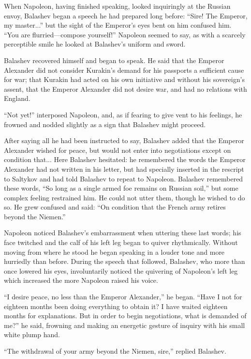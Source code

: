 When Napoleon, having finished speaking, looked inquiringly at
the Russian envoy, Balashev began a speech he had prepared long
before: ``Sire! The Emperor, my master...'' but the sight of the
Emperor's eyes bent on him confused him. ``You are
flurried---compose yourself!'' Napoleon seemed to say, as with a
scarcely perceptible smile he looked at Balashev's uniform and
sword.

Balashev recovered himself and began to speak. He said that the
Emperor Alexander did not consider Kurakin's demand for his
passports a sufficient cause for war; that Kurakin had acted on
his own initiative and without his sovereign's assent, that the
Emperor Alexander did not desire war, and had no relations with
England.

``Not yet!'' interposed Napoleon, and, as if fearing to give vent
to his feelings, he frowned and nodded slightly as a sign that
Balashev might proceed.

After saying all he had been instructed to say, Balashev added
that the Emperor Alexander wished for peace, but would not enter
into negotiations except on condition that... Here Balashev
hesitated: he remembered the words the Emperor Alexander had not
written in his letter, but had specially inserted in the rescript
to Saltykov and had told Balashev to repeat to Napoleon. Balashev
remembered these words, ``So long as a single armed foe remains
on Russian soil,'' but some complex feeling restrained him. He
could not utter them, though he wished to do so. He grew confused
and said: ``On condition that the French army retires beyond the
Niemen.''

Napoleon noticed Balashev's embarrassment when uttering these
last words; his face twitched and the calf of his left leg began
to quiver rhythmically. Without moving from where he stood he
began speaking in a louder tone and more hurriedly than
before. During the speech that followed, Balashev, who more than
once lowered his eyes, involuntarily noticed the quivering of
Napoleon's left leg which increased the more Napoleon raised his
voice.

``I desire peace, no less than the Emperor Alexander,'' he
began. ``Have I not for eighteen months been doing everything to
obtain it? I have waited eighteen months for explanations. But in
order to begin negotiations, what is demanded of me?'' he said,
frowning and making an energetic gesture of inquiry with his
small white plump hand.

``The withdrawal of your army beyond the Niemen, sire,'' replied
Balashev.

